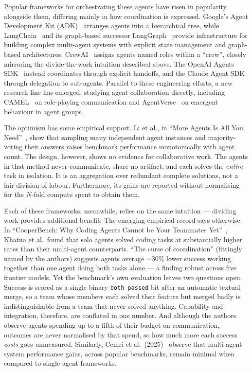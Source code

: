 \documentclass[11pt,a4paper]{article}
\begin{document}
Popular frameworks for orchestrating these agents have risen in popularity alongside them, differing mainly in how coordination is expressed. Google's Agent Development Kit (ADK)~\cite{google2025adk} arranges agents into a hierarchical tree, while LangChain~\cite{chase2022langchain} and its graph-based successor LangGraph~\cite{langchain2024langgraph} provide infrastructure for building complex multi-agent systems with explicit state management and graph-based architectures. CrewAI~\cite{crewai} assigns agents named roles within a ``crew'', closely mirroring the divide-the-work intuition described above. The OpenAI Agents SDK~\cite{openai2025agents} instead coordinates through explicit handoffs, and the Claude Agent SDK~\cite{anthropic2025claudesdk} through delegation to sub-agents. Parallel to these engineering efforts, a new research line has emerged, studying agent collaboration directly, including CAMEL~\cite{li2023camel} on role-playing communication and AgentVerse~\cite{chen2023agentverse} on emergent behaviour in agent groups.

The optimism has some empirical support. Li et al., in ``More Agents Is All You Need''~\cite{li2024moreagents}, show that sampling many independent agent instances and majority-voting their answers raises benchmark performance monotonically with agent count. The design, however, shows no evidence for collaborative work. The agents in that method never communicate, share no artifact, and each solves the \emph{entire} task in isolation. It is an aggregation over redundant complete solutions, not a fair division of labour. Furthermore, its gains are reported without normalising for the $N$-fold compute spent to obtain them.

Each of these frameworks, meanwhile, relies on the same intuition --- dividing work provides additional benefit. The emerging empirical record says otherwise. In ``CooperBench: Why Coding Agents Cannot be Your Teammates Yet''~\cite{khatua2026cooperbench}, Khatua et al.\ found that solo agents solved coding tasks at substantially higher rates than their multi-agent counterparts. ``The curse of coordination'' (fittingly named by the authors) suggests agents average ${\sim}30\%$ lower success working together than one agent doing both tasks alone --- a finding robust across five frontier models. Yet the benchmark's own evaluation leaves two questions open. Success is scored as a single binary \texttt{both\_passed} bit after an automatic textual merge, so a team whose members each solved their feature but merged badly is indistinguishable from a team that never solved anything. Capability and integration, therefore, are conflated in one number. And although the authors observe agents spending up to a fifth of their budget on communication, outcomes are never normalised by that spend, so how much more each success \emph{costs} goes unmeasured. Similarly, Cemri et al.\ (2025)~\cite{cemri2025why} observe that multi-agent system performance gains, across popular benchmarks, remain minimal when compared to single-agent frameworks.
\end{document}
